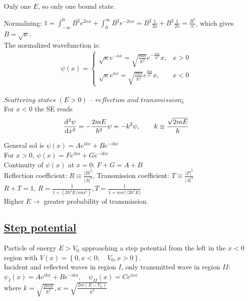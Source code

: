 Only one $E$, so only one bound state.

Normalizing: $1 = \int_{-\infty}^{0} B^2 e^{2 \kappa x} + \int_{0}^{\infty} B^2 e^{-2 \kappa x} = B^2 \frac{1}{2 \kappa} + B^2 \frac{1}{2 \kappa} = \frac{B^2}{\kappa}$, which gives $B = \sqrt{\kappa}$. \\

The normalized wavefunction is: 
\begin{align*}
\psi(x) = 
    \begin{cases} 
        \sqrt{\kappa} e^{-\kappa x} = \sqrt{\frac{m\alpha}{\hbar^2}} e^{-\frac{m\alpha}{\hbar^2}} x, & x > 0 \\ 
        \sqrt{\kappa} e^{\kappa x} = \sqrt{\frac{m\alpha}{\hbar^2}} e^{\frac{m \alpha}{\hbar^2}} x, & x < 0
    \end{cases}
\end{align*}

\underline{$\textit{Scattering states } (E > 0) \textit{ -- reflection and transmission}$:} \\

For $x < 0$ the SE reads $$\dv[2]{\psi}{x} = -\frac{2mE}{\hbar^2} \psi = -k^2 \psi, \qquad k \equiv \frac{\sqrt{2mE}}{\hbar}$$

General sol is $\psi(x) = Ae^{ikx} + Be^{-ikx}$ \\
For $x > 0$, $\psi(x) = Fe^{ikx} + Ge^{-ikx}$ \\

Continuity of $\psi(x)$ at $x = 0$: $F+G=A+B$ \\

Reflection coefficient: $R \equiv \frac{|B|^2}{|A|^2}$, 
Transmission coefficient: $T \equiv \frac{|F|^2}{|A|^2}$ \\
$R + T = 1$, $R = \frac{1}{1+(2\hbar^2E/m \alpha^2)}, T = \frac{1}{1+m \alpha^2 / 2 \hbar^2 E)}$ \\
Higher $E \rightarrow$ greater probability of transmission.

\subsection{\underline{Step potential}}
Particle of energy $E > V_0$ approaching a step potential from the left in the $x < 0$ region with $V(x) = \left\{ 0, x < 0; \quad V_0, x > 0 \right\}.$ \\

Incident and reflected waves in region $I$, only transmitted wave in region $II$:
$\psi_{I}(x) = Ae^{ikx} + Be^{-ikx}, \quad \psi_{II}(x) = Ce^{i\kappa x}$ \\
where $k = \sqrt{\frac{2mE}{\hbar^2}}, \kappa = \sqrt{\frac{2m(E - V_0)}{\hbar^2}}$ \\

